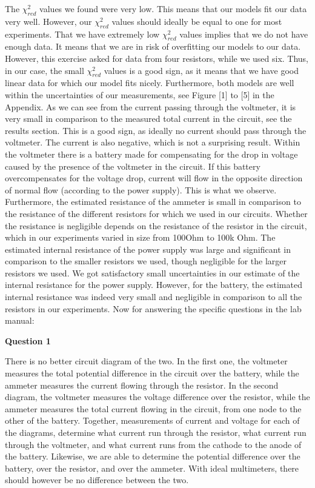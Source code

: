 \documentclass[letterpaper,12pt]{article}
\begin{document}
The $\chi_{red}^2$ values we found were very low. This means that our models fit our data very well. 
However, our $\chi_{red}^2$ values should ideally be equal to one for most experiments. 
That we have extremely low $\chi_{red}^2$ values implies that we do not have enough data. 
It means that we are in risk of overfitting our models to our data. However, 
this exercise asked for data from four resistors, while we used six. 
Thus, in our case, the small $\chi_{red}^2$ values is a good sign, as it means that 
we have good linear data for which our model fits nicely. Furthermore,
 both models are well within the uncertainties of our measurements, 
 see Figure [1] to [5] in the Appendix.
As we can see from the current passing through the voltmeter, 
it is very small in comparison to the measured total current in the circuit, see the results section. 
This is a good sign, as ideally no current should pass through the voltmeter. 
The current is also negative, which is not a surprising result. 
Within the voltmeter there is a battery made for compensating for the drop in voltage 
caused by the presence of the voltmeter in the circuit. If this battery overcompensates 
for the voltage drop, current will flow in the opposite direction of normal 
flow (according to the power supply). This is what we observe.
Furthermore, the estimated resistance of the ammeter is small in comparison to the 
resistance of the different resistors for which we used in our circuits. 
Whether the resistance is negligible depends on the resistance of the resistor 
in the circuit, which in our experiments varied in size from 100Ohm to 100k Ohm.
The estimated internal resistance of the power supply was large and significant 
in comparison to the smaller resistors we used, though negligible for the larger 
resistors we used. We got satisfactory small uncertainties in our estimate of the 
internal resistance for the power supply. However, for the battery, the estimated 
internal resistance was indeed very small and negligible in comparison to all the 
resistors in our experiments.
Now for answering the specific questions in the lab manual:

\textbf{Question 1}

There is no better circuit diagram of the two. In the first one, 
the voltmeter measures the total potential difference in the circuit over the battery, 
while the ammeter measures the current flowing through the resistor. 
In the second diagram, the voltmeter measures the voltage difference over the resistor, 
while the ammeter measures the total current flowing in the circuit, 
from one node to the other of the battery. Together, measurements of current 
and voltage for each of the diagrams, determine what current run through the resistor, 
what current run through the voltmeter, and what current runs from the cathode 
to the anode of the battery. Likewise, we are able to determine the potential 
difference over the battery, over the resistor, and over the ammeter. 
With ideal multimeters, there should however be no difference between the two.
\end{document}
